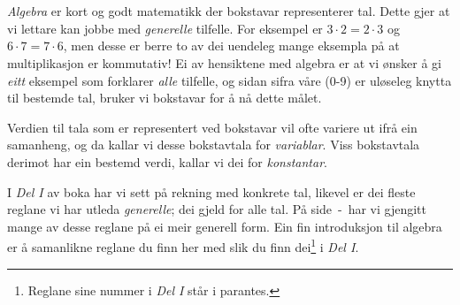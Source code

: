 


\section{\algintro}
\textit{Algebra} er kort og godt matematikk der bokstavar representerer tal. Dette gjer at vi lettare kan jobbe med \textsl{generelle} tilfelle. For eksempel er $ {3\cdot 2=2\cdot3} $ og $ 6\cdot7=7\cdot6 $, men desse er berre to av dei uendeleg mange eksempla på at multiplikasjon er kommutativ! Ei av hensiktene med algebra er at vi ønsker å gi \textsl{eitt} eksempel som forklarer \textsl{alle} tilfelle, og sidan sifra våre (0-9) er uløseleg knytta til bestemde tal, bruker vi bokstavar for å nå dette målet. \vsk

Verdien til tala som er representert ved bokstavar vil ofte variere ut ifrå ein samanheng, og da kallar vi desse bokstavtala for \textit{variablar}. Viss bokstavtala derimot har ein bestemd verdi, kallar vi dei for \textit{konstantar}.

\vsk

I \textsl{Del I} av boka har vi sett på rekning med konkrete tal, likevel er dei fleste reglane vi har utleda \textsl{generelle}; dei gjeld for alle tal. På side \pageref{regstart}\,-\,\pageref{regslutt} har vi gjengitt mange av desse reglane på ei meir generell form. Ein fin introduksjon til algebra er å samanlikne reglane du finn her med slik du finn dei\footnote{Reglane sine nummer i \textsl{Del I} står i parantes.} i \textsl{Del I}. \vsk

\regv
\label{regstart}
\reg[\adkom\;(\ref{adkom}) \label{adkomalg}]{\vs
\[ a+ b =b+a \]
}
\eks{ \vsb
\[ 7+ 5=5+7 \]
} \vsk \vsk

\reg[\gangkom\;(\ref{gangkom})]{\vs
	\[ a\cdot b =b\cdot a \]
}
\eks[1]{ \vsb
	\[ 9\cdot 8=8\cdot9 \]
}
\eks[2]{ \vsb
\[  8\cdot a= a\cdot 8  \]
}
\newpage
{}
\vsk 

\reg[\brdef\;(\ref{brdef})]{
\[ a:b=\frac{a}{b} \]
}
\eks[]{ \vs
\[a:2= \frac{a}{2} \]
}
 \vsk 

\reg[\brtbr\; (\ref{brtbr})]{
\[ \frac{a}{b}\cdot\frac{c}{d}=\frac{a c}{b d} \]
}
\eks[2]{ \vs
	\[ \frac{3}{b}\cdot \frac{a}{7}=\frac{3 a}{7b} \]
}
\newpage
\reg[\brdelmbr\;(\ref{delmbr})]{ 
\[ \frac{a}{b}:\frac{c}{d}=\frac{a}{b}\cdot \frac{d}{c} \]
}
\eks[1]{ \vs
\[ \frac{1}{2}:\frac{5}{7}=\frac{1}{2}\cdot \frac{7}{5} \]
}
 \vsk \vsk

